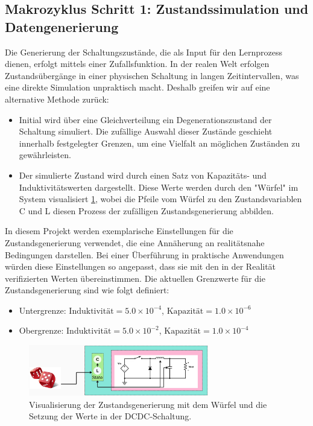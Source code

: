 \subsection{ Makrozyklus Schritt 1: Zustandssimulation und Datengenerierung}

Die Generierung der Schaltungszustände, die als Input für den Lernprozess dienen, erfolgt mittels einer Zufallsfunktion. In der realen Welt erfolgen Zustandsübergänge in einer physischen Schaltung in langen Zeitintervallen, was eine direkte Simulation unpraktisch macht. Deshalb greifen wir auf eine alternative Methode zurück:

\begin{itemize}
    \item Initial wird über eine Gleichverteilung ein Degenerationszustand der Schaltung simuliert. Die zufällige Auswahl dieser Zustände geschieht innerhalb festgelegter Grenzen, um eine Vielfalt an möglichen Zuständen zu gewährleisten.
	\item Der simulierte Zustand wird durch einen Satz von Kapazitäts- und Induktivitätswerten dargestellt. Diese Werte werden durch den "Würfel" im System visualisiert \ref{fig:state_generation}, wobei die Pfeile vom Würfel zu den Zustandsvariablen C und L diesen Prozess der zufälligen Zustandsgenerierung abbilden.
\end{itemize}

In diesem Projekt werden exemplarische Einstellungen für die Zustandsgenerierung verwendet, die eine Annäherung an realitätsnahe Bedingungen darstellen. Bei einer Überführung in praktische Anwendungen würden diese Einstellungen so angepasst, dass sie mit den in der Realität verifizierten Werten übereinstimmen. Die aktuellen Grenzwerte für die Zustandsgenerierung sind wie folgt definiert:

\begin{itemize}
    \item Untergrenze: \( \text{Induktivität} = 5.0 \times 10^{-4} \), \( \text{Kapazität} = 1.0 \times 10^{-6} \)
    \item Obergrenze: \( \text{Induktivität} = 5.0 \times 10^{-2} \), \( \text{Kapazität} = 1.0 \times 10^{-4} \)
\end{itemize}

\begin{figure}[htbp]
\centering
\includegraphics[width=0.7\textwidth]{3Experiment/2Experiment/1Random_Set_State.png}
\caption{Visualisierung der Zustandsgenerierung mit dem Würfel und die Setzung der Werte in der DCDC-Schaltung.}
\label{fig:state_generation}
\end{figure}
